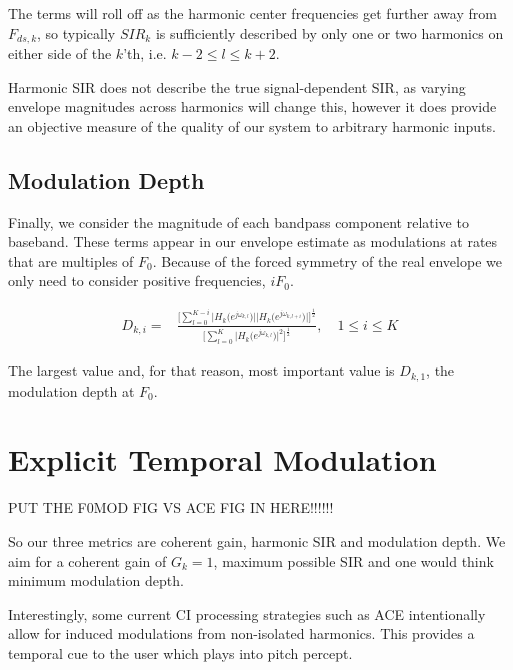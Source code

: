 \documentclass [11pt, proquest] {uwthesis}[2015/03/03]
\begin{document}
The terms will roll off as the harmonic center frequencies get further away from $F_{ds,k}$, so typically $SIR_k$ is sufficiently described by only one or two harmonics on either side of the $k$'th, i.e. $k-2 \leq l \leq k+2$.

Harmonic SIR does not describe the true signal-dependent SIR, as varying envelope magnitudes across harmonics will change this, however it does provide an objective measure of the quality of our system to arbitrary harmonic inputs.


\subsection{Modulation Depth}

Finally, we consider the magnitude of each bandpass component relative to baseband.  These terms appear in our envelope estimate as modulations at rates that are multiples of $F_0$.  Because of the forced symmetry of the real envelope we only need to consider positive frequencies, $iF_0$.

\begin{align}
D_{k,i} =& \frac{\Bigg[ \sum\limits_{l=0}^{K-i} \Big|H_k\big(e^{j\omega_{k,l}}\big)\Big| \Big|H_k\big(e^{j\omega_{k,l+i}}\big)\Big|\Bigg]^\frac{1}{2}}
{\Bigg[ \sum\limits_{l=0}^K \Big|H_k\big(e^{j\omega_{k,l}}\big)\Big|^2 \Bigg] ^ \frac{1}{2}}, \quad 1 \leq i \leq K
\end{align}

The largest value and, for that reason, most important value is $D_{k,1}$, the modulation depth at $F_0$.

\section{Explicit Temporal Modulation}

PUT THE F0MOD FIG VS ACE FIG IN HERE!!!!!!

So our three metrics are coherent gain, harmonic SIR and modulation depth.  We aim for a coherent gain of $G_k = 1$, maximum possible SIR and one would think minimum modulation depth.

Interestingly, some current CI processing strategies such as ACE intentionally allow for induced modulations from non-isolated harmonics.  This provides a temporal cue to the user which plays into pitch percept.
\end{document}
